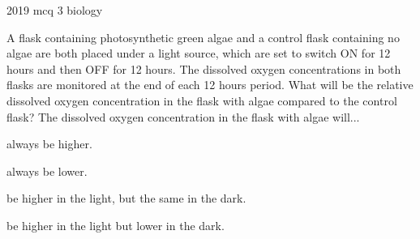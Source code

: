 \ylDisplay
{}%
{2019}%
{mcq}%
{3}%
{biology}%
{}%
{
\ifStatement
A flask containing photosynthetic green algae and a control flask containing no algae are both  placed under a light source, which are set to switch ON for 12 hours and then OFF for 12  hours. The dissolved oxygen concentrations in both flasks are monitored at the end of each  12 hours period. What will be the relative dissolved oxygen concentration in the flask with  algae compared to the control flask? The dissolved oxygen concentration in the flask with algae will...
\fi


always be higher.
\fi


always be lower.
\fi


be higher in the light, but the same in the dark.
\fi


be higher in the light but lower in the dark.
\fi


\ifHint

\fi


\ifSolution

\fi


\ifEstStatement

\fi



\fi



\fi



\fi



\fi


\ifEstHint

\fi


\ifEstSolution

\fi
}

